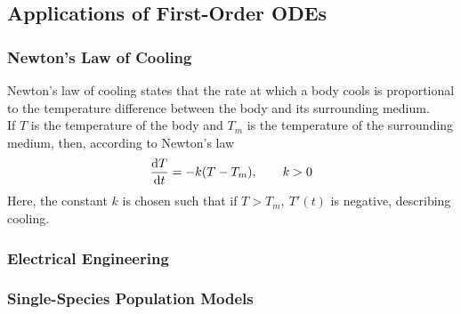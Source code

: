 \documentclass{report}
\begin{document}
\subsection*{Applications of First-Order ODEs}
\subsubsection*{Newton's Law of Cooling}
Newton's law of cooling states that the rate at which a body cools is proportional to the temperature difference between the body and its surrounding medium. \\

If $T$ is the temperature of the body and $T_m$ is the temperature of the surrounding medium, then, according to Newton's law
$$
	\dyd[T]{t} = -k(T-T_m),\qquad k > 0
$$
Here, the constant $k$ is chosen such that if $T > T_m,\ T'(t)$ is negative, describing cooling.

\subsubsection*{Electrical Engineering}

\subsubsection*{Single-Species Population Models}
\end{document}
